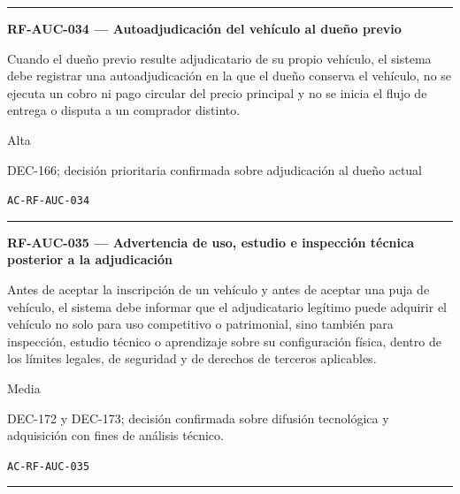 \documentclass[10pt,letterpaper]{article}
\begin{document}
\vspace{0.25em}\hrule\vspace{0.65em}
\noindent\textbf{RF-AUC-034 --- Autoadjudicación del vehículo al dueño previo}\par
\begin{description}[style=nextline,leftmargin=3.15cm,labelwidth=2.8cm,font=\normalfont\bfseries]
\item[Obligación] Cuando el dueño previo resulte adjudicatario de su propio vehículo, el sistema debe registrar una autoadjudicación en la que el dueño conserva el vehículo, no se ejecuta un cobro ni pago circular del precio principal y no se inicia el flujo de entrega o disputa a un comprador distinto.
\item[Prioridad] Alta
\item[Procedencia] DEC-166; decisión prioritaria confirmada sobre adjudicación al dueño actual
\item[Verificación] \texttt{AC-RF-AUC-034}
\end{description}
\vspace{0.25em}\hrule\vspace{0.65em}
\noindent\textbf{RF-AUC-035 --- Advertencia de uso, estudio e inspección técnica posterior a la adjudicación}\par
\begin{description}[style=nextline,leftmargin=3.15cm,labelwidth=2.8cm,font=\normalfont\bfseries]
\item[Obligación] Antes de aceptar la inscripción de un vehículo y antes de aceptar una puja de vehículo, el sistema debe informar que el adjudicatario legítimo puede adquirir el vehículo no solo para uso competitivo o patrimonial, sino también para inspección, estudio técnico o aprendizaje sobre su configuración física, dentro de los límites legales, de seguridad y de derechos de terceros aplicables.
\item[Prioridad] Media
\item[Procedencia] DEC-172 y DEC-173; decisión confirmada sobre difusión tecnológica y adquisición con fines de análisis técnico.
\item[Verificación] \texttt{AC-RF-AUC-035}
\end{description}
\vspace{0.25em}\hrule\vspace{0.65em}
\end{document}
